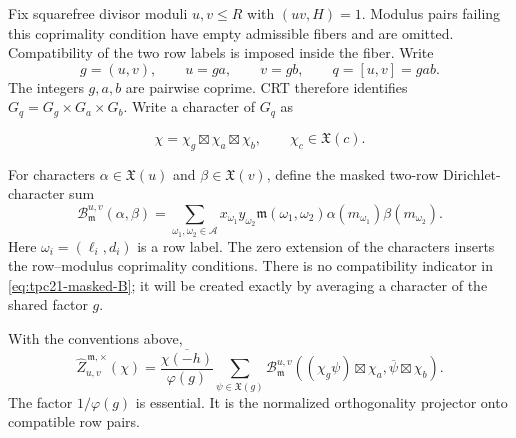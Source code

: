 Fix squarefree divisor moduli \(u,v\leq R\) with \((uv,H)=1\).
Modulus pairs failing this coprimality condition have empty admissible
fibers and are omitted.  Compatibility of the two row labels is imposed
inside the fiber.  Write
\begin{equation}
 g=(u,v),\qquad u=ga,\qquad v=gb,\qquad q=[u,v]=gab.
 \label{eq:tpc21-character-gab}
\end{equation}
The integers \(g,a,b\) are pairwise coprime.  CRT therefore identifies
\(G_q=G_g\times G_a\times G_b\).  Write a character of \(G_q\) as

\[
 \chi=\chi_g\boxtimes\chi_a\boxtimes\chi_b,
 \qquad
 \chi_c\in\mathfrak X(c).
\]

For characters \(\alpha\in\mathfrak X(u)\) and
\(\beta\in\mathfrak X(v)\), define the masked two-row
Dirichlet-character sum
\begin{equation}
 \mathcal B_{\mathfrak m}^{u,v}(\alpha,\beta)
 =\sum_{\omega_1,\omega_2\in\mathcal A}
 x_{\omega_1}y_{\omega_2}
 \mathfrak m(\omega_1,\omega_2)
 \alpha(m_{\omega_1})\beta(m_{\omega_2}).
 \label{eq:tpc21-masked-B}
\end{equation}
Here \(\omega_i=(\ell_i,d_i)\) is a row label.  The zero extension of
the characters inserts the row--modulus coprimality conditions.  There
is no compatibility indicator in \eqref{eq:tpc21-masked-B}; it will be
created exactly by averaging a character of the shared factor \(g\).

\begin{theorem}
\label{thm:tpc21-masked-shared-character}
With the conventions above,
\begin{equation}
 \boxed{
 \widehat Z_{u,v}^{\,\mathfrak m,\times}(\chi)
 =\frac{\overline{\chi(-h)}}{\varphi(g)}
  \sum_{\psi\in\mathfrak X(g)}
  \mathcal B_{\mathfrak m}^{u,v}
  \left(
   (\chi_g\psi)\boxtimes\chi_a,
   \overline\psi\boxtimes\chi_b
  \right).}
 \label{eq:tpc21-masked-shared-character}
\end{equation}
The factor \(1/\varphi(g)\) is essential.  It is the normalized
orthogonality projector onto compatible row pairs.
\end{theorem}

